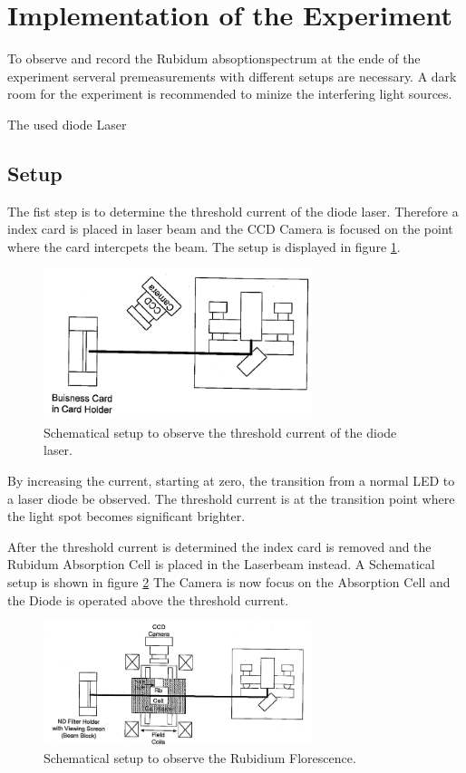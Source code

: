\section{Implementation of the Experiment}
\label{sec:Durchführung}
To observe and record the Rubidum absoptionspectrum at the ende
of the experiment
serveral premeasurements with different setups are necessary.
A dark room for the experiment is recommended to minize the
interfering light sources.

The used diode Laser

\subsection{Setup}
\label{subsec:setup}
The fist step is to determine the threshold current
of the diode laser.
Therefore a index card is placed in laser beam and the CCD Camera
is focused on the point where the card intercpets the beam.
The setup is displayed
in figure \ref{fig:setup1}.

\begin{figure}
  \centering
  \includegraphics[width=0.7\textwidth]{setup1.png}
  \caption{Schematical setup to observe the threshold current of the diode laser.\cite{V61}}
  \label{fig:setup1}
\end{figure}
By increasing the current, starting at zero, the transition from
a normal LED to a laser diode be observed.
The threshold current is at the
transition point where the light spot becomes significant brighter.

After the threshold current is determined the
index card is removed and
the Rubidum Absorption Cell
is placed in the Laserbeam instead.
A Schematical setup is shown in figure \ref{fig:setup2}
The Camera is now
focus on the Absorption Cell and
the Diode is operated above the threshold current.

\begin{figure}
  \centering
  \includegraphics[width=0.7\textwidth]{setup2.png}
  \caption{Schematical setup to observe the Rubidium Florescence.\cite{V61}}
  \label{fig:setup2}
\end{figure}

